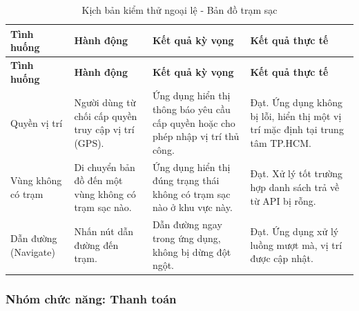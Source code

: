 \begin{center}
    \renewcommand{\arraystretch}{1.5}
    \begin{longtable}{|>{\raggedright\arraybackslash}m{}|>{\raggedright\arraybackslash}m{}|>{\raggedright\arraybackslash}m{}|>{\raggedright\arraybackslash}m{}|}
        \caption{Kịch bản kiểm thử ngoại lệ - Bản đồ trạm sạc}
        \label{tab:map_negative} \\
        \hline
        \textbf{Tình huống} & \textbf{Hành động} & \textbf{Kết quả kỳ vọng} & \textbf{Kết quả thực tế} \\
        \hline
        \endfirsthead
        
        \hline
        \textbf{Tình huống} & \textbf{Hành động} & \textbf{Kết quả kỳ vọng} & \textbf{Kết quả thực tế} \\
        \hline
        \endhead
        
        Quyền vị trí & Người dùng từ chối cấp quyền truy cập vị trí (GPS). & Ứng dụng hiển thị thông báo yêu cầu cấp quyền hoặc cho phép nhập vị trí thủ công. & Đạt. Ứng dụng không bị lỗi, hiển thị một vị trí mặc định tại trung tâm TP.HCM. \\
        \hline
        Vùng không có trạm & Di chuyển bản đồ đến một vùng không có trạm sạc nào. & Ứng dụng hiển thị đúng trạng thái không có trạm sạc nào ở khu vực này. & Đạt. Xử lý tốt trường hợp danh sách trả về từ API bị rỗng. \\
        \hline
        Dẫn đường (Navigate) & Nhấn nút dẫn đường đến trạm. & Dẫn đường ngay trong ứng dụng, không bị dừng đột ngột. & Đạt. Ứng dụng xử lý luồng mượt mà, vị trí được cập nhật. \\
        \hline
    \end{longtable}
\end{center}

\subsubsection{Nhóm chức năng: Thanh toán}

